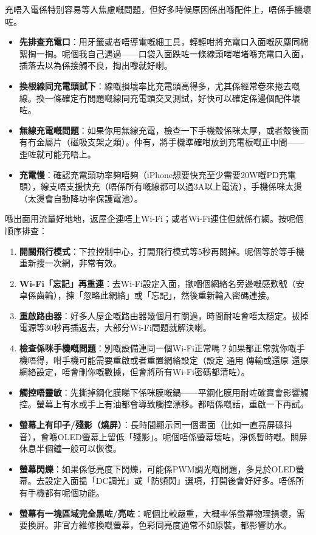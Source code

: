 
充唔入電係特別容易等人焦慮嘅問題，但好多時候原因係出喺配件上，唔係手機壞咗。

\begin{itemize}
  \item \textbf{先排查充電口}：用牙籤或者唔導電嘅細工具，輕輕咁將充電口入面嘅灰塵同棉絮掏一掏。呢個我自己遇過——口袋入面跌咗一條線頭啱啱堵喺充電口入面，插落去以為係接觸不良，掏出嚟就好喇。
  \item \textbf{換根線同充電頭試下}：線嘅損壞率比充電頭高得多，尤其係經常卷來捲去嘅線。換一條確定冇問題嘅線同充電頭交叉測試，好快可以確定係邊個配件壞咗。
  \item \textbf{無線充電嘅問題}：如果你用無線充電，檢查一下手機殼係咪太厚，或者殼後面有冇金屬片（磁吸支架之類）。仲有，將手機準確咁放到充電板嘅正中間——歪咗就可能充唔上。
  \item \textbf{充電慢}：確認充電頭功率夠唔夠（iPhone想要快充至少需要20W嘅PD充電頭），線支唔支援快充（唔係所有嘅線都可以過3A以上電流），手機係咪太燙（太燙會自動降功率保護電池）。
\end{itemize}


喺出面用流量好地地，返屋企連唔上Wi-Fi；或者Wi-Fi連住但就係冇網。按呢個順序排查：

\begin{enumerate}
  \item \textbf{開關飛行模式}：下拉控制中心，打開飛行模式等5秒再關掉。呢個等於等手機重新搜一次網，非常有效。
  \item \textbf{Wi-Fi「忘記」再重連}：去Wi-Fi設定入面，撳嗰個網絡名旁邊嘅感歎號（安卓係齒輪），揀「忽略此網絡」或「忘記」，然後重新輸入密碼連接。
  \item \textbf{重啟路由器}：好多人屋企嘅路由器幾個月冇關過，時間耐咗會唔太穩定。拔掉電源等30秒再插返去，大部分Wi-Fi問題就解決喇。
  \item \textbf{檢查係咪手機嘅問題}：別嘅設備連同一個Wi-Fi正常嗎？如果都正常就你嘅手機唔得，咁手機可能需要重啟或者重置網絡設定（設定 通用 傳輸或還原 還原網絡設定，唔會刪你嘅數據，但會將所有Wi-Fi密碼都清咗）。
\end{enumerate}


\begin{itemize}
  \item \textbf{觸控唔靈敏}：先撕掉鋼化膜睇下係咪膜嘅鍋——平鋼化膜用耐咗確實會影響觸控。螢幕上有水或手上有油都會導致觸控漂移。都唔係嘅話，重啟一下再試。
  \item \textbf{螢幕上有印子/殘影（燒屏）}：長時間顯示同一個畫面（比如一直亮屏碌抖音），會喺OLED螢幕上留低「殘影」。呢個唔係螢幕壞咗，淨係暫時嘅。關屏休息半個鐘一般可以恢復。
  \item \textbf{螢幕閃爍}：如果係低亮度下閃爍，可能係PWM調光嘅問題，多見於OLED螢幕。去設定入面揾「DC調光」或「防頻閃」選項，打開後會好好多。唔係所有手機都有呢個功能。
  \item \textbf{螢幕有一塊區域完全黑咗/亮咗}：呢個比較嚴重，大概率係螢幕物理損壞，需要換屏。非官方維修換嘅螢幕，色彩同亮度通常不如原裝，都影響防水。
\end{itemize}

